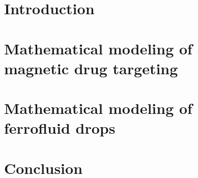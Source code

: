 %


\section{Introduction}
\label{intro}

\section{Mathematical modeling of magnetic drug targeting}
\label{mdt}

\FloatBarrier
\section{Mathematical modeling of ferrofluid drops}
\label{drop}

\FloatBarrier

\FloatBarrier


\section{Conclusion}

\FloatBarrier







